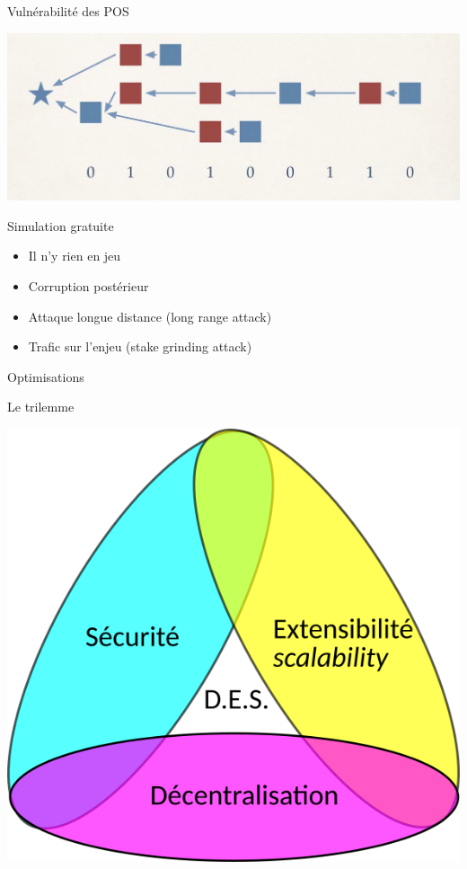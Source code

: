 \documentclass[presentation]{beamer}
\begin{document}
\begin{frame}[label={sec:orgb5cea10}]{Vulnérabilité des POS}
\begin{center}
\includegraphics[height=.3\paperheight]{Images/longuest_chain.png}
\end{center}

\begin{block}{Simulation gratuite}
\begin{itemize}
\item Il n'y rien en jeu
\item Corruption postérieur
\item Attaque longue distance (long range attack)
\end{itemize}

\begin{itemize}
\item Trafic sur l'enjeu  (stake grinding attack)
\end{itemize}
\end{block}
\end{frame}



\begin{frame}[label={sec:org87d9e3f}]{Optimisations}
\begin{block}{Le trilemme}
\begin{center}
\includegraphics[width=.7\paperheight]{Images/trilemme_ven.png}
\end{center}
\end{block}
\end{frame}
\end{document}
